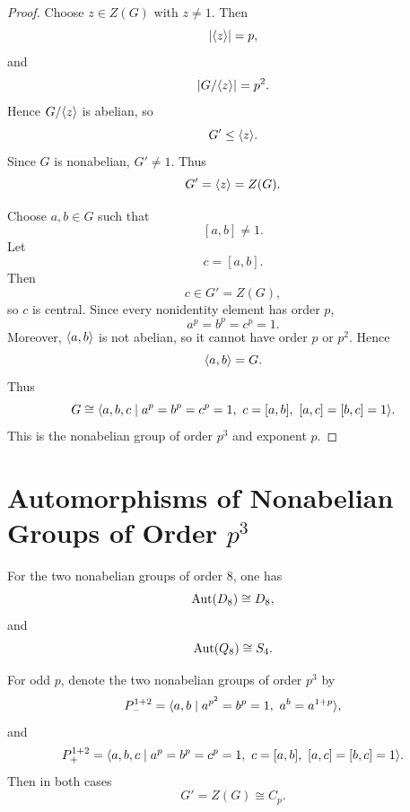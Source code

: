 \begin{proof}
Choose \(z\in Z(G)\) with \(z\neq 1\). Then
\[
    |\langle z\rangle|=p,
\]
and
\[
    |G/\langle z\rangle|=p^2.
\]
Hence \(G/\langle z\rangle\) is abelian, so
\[
    G'\leq \langle z\rangle.
\]
Since \(G\) is nonabelian, \(G'\neq 1\). Thus
\[
    G'=\langle z\rangle=Z(G).
\]

Choose \(a,b\in G\) such that
\[
    [a,b]\neq 1.
\]
Let
\[
    c=[a,b].
\]
Then
\[
    c\in G'=Z(G),
\]
so \(c\) is central. Since every nonidentity element has order \(p\),
\[
    a^p=b^p=c^p=1.
\]
Moreover, \(\langle a,b\rangle\) is not abelian, so it cannot have order \(p\) or \(p^2\). Hence
\[
    \langle a,b\rangle=G.
\]
Thus
\[
    G\cong
    \langle 
        a,b,c
        \mid
        a^p=b^p=c^p=1,\ c=[a,b],\ [a,c]=[b,c]=1
    \rangle.
\]
This is the nonabelian group of order \(p^3\) and exponent \(p\).
\end{proof}

\section{Automorphisms of Nonabelian Groups of Order \texorpdfstring{$p^3$}{p3}}

\begin{remark}
For the two nonabelian groups of order \(8\), one has
\[
    \operatorname{Aut}(D_8)\cong D_8,
\]
and
\[
    \operatorname{Aut}(Q_8)\cong S_4.
\]
\end{remark}

\begin{definition}
For odd \(p\), denote the two nonabelian groups of order \(p^3\) by
\[
    P_-^{1+2}
    =
    \langle 
        a,b
        \mid
        a^{p^2}=b^p=1,\ a^b=a^{1+p}
    \rangle,
\]
and
\[
    P_+^{1+2}
    =
    \langle 
        a,b,c
        \mid
        a^p=b^p=c^p=1,\ c=[a,b],\ [a,c]=[b,c]=1
    \rangle.
\]
Then in both cases
\[
    G'=Z(G)\cong C_p.
\]
\end{definition}

